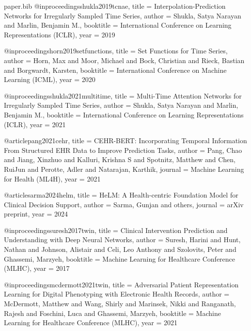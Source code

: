 \begin{filecontents*}{paper.bib}
@inproceedings{shukla2019tcnae,
  title     = {Interpolation-Prediction Networks for Irregularly Sampled Time Series},
  author    = {Shukla, Satya Narayan and Marlin, Benjamin M.},
  booktitle = {International Conference on Learning Representations (ICLR)},
  year      = {2019}
}

@inproceedings{horn2019setfunctions,
  title     = {Set Functions for Time Series},
  author    = {Horn, Max and Moor, Michael and Bock, Christian and Rieck, Bastian and Borgwardt, Karsten},
  booktitle = {International Conference on Machine Learning (ICML)},
  year      = {2020}
}

@inproceedings{shukla2021multitime,
  title     = {Multi-Time Attention Networks for Irregularly Sampled Time Series},
  author    = {Shukla, Satya Narayan and Marlin, Benjamin M.},
  booktitle = {International Conference on Learning Representations (ICLR)},
  year      = {2021}
}

@article{pang2021cehr,
  title   = {{CEHR-BERT}: Incorporating Temporal Information From Structured {EHR} Data to Improve Prediction Tasks},
  author  = {Pang, Chao and Jiang, Xinzhuo and Kalluri, Krishna S and Spotnitz, Matthew and Chen, RuiJun and Perotte, Adler and Natarajan, Karthik},
  journal = {Machine Learning for Health (ML4H)},
  year    = {2021}
}

@article{sarma2024helm,
  title   = {{HeLM}: A Health-centric Foundation Model for Clinical Decision Support},
  author  = {Sarma, Gunjan and others},
  journal = {arXiv preprint},
  year    = {2024}
}

@inproceedings{suresh2017twin,
  title     = {Clinical Intervention Prediction and Understanding with Deep Neural Networks},
  author    = {Suresh, Harini and Hunt, Nathan and Johnson, Alistair and Celi, Leo Anthony and Szolovits, Peter and Ghassemi, Marzyeh},
  booktitle = {Machine Learning for Healthcare Conference (MLHC)},
  year      = {2017}
}

@inproceedings{mcdermott2021twin,
  title     = {Adversarial Patient Representation Learning for Digital Phenotyping with Electronic Health Records},
  author    = {McDermott, Matthew and Wang, Shirly and Marinsek, Nikki and Ranganath, Rajesh and Foschini, Luca and Ghassemi, Marzyeh},
  booktitle = {Machine Learning for Healthcare Conference (MLHC)},
  year      = {2021}
}
\end{filecontents*}

\documentclass[11pt,letterpaper]{article}

